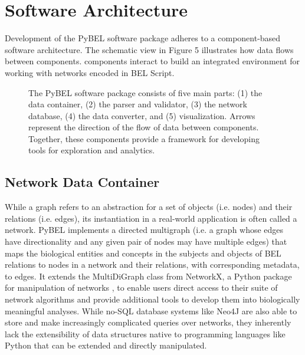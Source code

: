 \section{Software Architecture}

Development of the PyBEL software package adheres to a component-based software architecture. The schematic view in Figure 5 illustrates how data flows between components. components interact to build an integrated environment for working with networks encoded in BEL Script. 

\begin{figure}
\captionsetup{format=plain}
\caption[The PyBEL Software Architecture]{The PyBEL software package consists of five main parts: (1) the data container, (2) the parser and validator, (3) the network database, (4) the data converter, and (5) visualization. Arrows represent the direction of the flow of data between components. Together, these components provide a framework for developing tools for exploration and analytics.}
\label{Fig:pybel_components}
\end{figure}

\subsection{Network Data Container}
While a graph refers to an abstraction for a set of objects (i.e. nodes) and their relations (i.e. edges), its instantiation in a real-world application is often called a network. PyBEL implements a directed multigraph (i.e. a graph whose edges have directionality and any given pair of nodes may have multiple edges) that maps the biological entities and concepts in the subjects and objects of \ac{BEL} relations to nodes in a network and their relations, with corresponding metadata, to edges. It extends the MultiDiGraph class from NetworkX, a Python package for manipulation of networks \cite{Hagberg2008}, to enable users direct access to their suite of network algorithms and provide additional tools to develop them into biologically meaningful analyses. While no-SQL database systems like Neo4J \cite{neo4j} are also able to store and make increasingly complicated queries over networks, they inherently lack the extensibility of data structures native to programming languages like Python that can be extended and directly manipulated.

